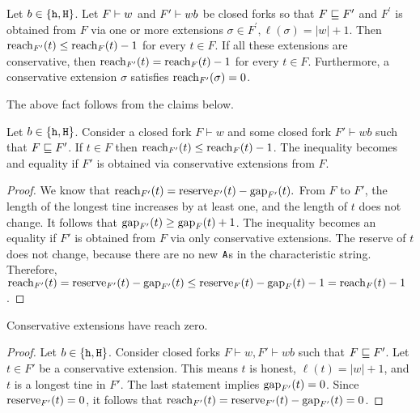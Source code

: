 \begin{fact}\label{fact:reach-fork-ext}
  Let $b \in \{\mathtt{h}, \mathtt{H}\}$. 
  Let $F \vdash w$ and $F^\prime \vdash wb$ be closed forks so that 
  $F \sqsubseteq F^\prime$ and 
  $F^\prime$ is obtained from $F$ via one or more extensions 
  $\sigma \in F^\prime, \ell(\sigma) = |w| + 1$.
  Then $\operatorname{reach}_{F^\prime}(t) \leq \operatorname{reach}_F(t) - 1$ for every $t \in F$. 
  If all these extensions are conservative, then 
  $\operatorname{reach}_{F^\prime}(t) = \operatorname{reach}_F(t) - 1$ for every $t \in F$. 
  Furthermore, a conservative extension $\sigma$ satisfies 
  $\operatorname{reach}_{F^\prime}(\sigma) = 0$.
\end{fact}
The above fact follows from the claims below.
\begin{claim}\label{claim:nex}
  Let $b \in \{\mathtt{h}, \mathtt{H}\}$. 
  Consider a closed fork $F\vdash w$ and some closed fork $F'\vdash wb$ such that $F\sqsubseteq F'$. 
  If $t \in F$ then 
  $\operatorname{reach}_{F'}(t)\leq \operatorname{reach}_{F}(t) - 1$. 
  The inequality becomes and equality 
  if $F'$ is obtained via 
  conservative extensions from $F$.
\end{claim}
\begin{proof}
  We know that $\operatorname{reach}_{F'}(t)=\operatorname{reserve}_{F'}(t)-\operatorname{gap}_{F'}(t).$ From $F$ to $F'$, the length of the longest tine increases by at least one, and the length of $t$ does not change. 
  It follows that $\operatorname{gap}_{F'}(t) \geq \operatorname{gap}_{F}(t) + 1$. 
  The inequality becomes an equality 
  if $F'$ is obtained from $F$ via only conservative extensions. 
  The reserve of $t$ does not change, because there are no new $\mathtt{A}$s in the characteristic string. Therefore, 
  $
    \operatorname{reach}_{F'}(t)
    =\operatorname{reserve}_{F'}(t)-\operatorname{gap}_{F'}(t)
    \leq \operatorname{reserve}_{F}(t)-\operatorname{gap}_{F}(t) - 1
    =\operatorname{reach}_{F}(t) - 1
  $. 
\end{proof}
\begin{claim}\label{claim:ex}
  Conservative extensions have reach zero.
\end{claim}
\begin{proof}
  Let $b \in \{\mathtt{h}, \mathtt{H}\}$. 
  Consider closed forks $F\vdash w, F'\vdash wb$ 
  such that $F\sqsubseteq F'$. 
  Let $t \in F'$ be a conservative extension. 
  This means $t$ is honest, $\ell(t) = |w| + 1$, 
  and 
  $t$ is a longest tine in $F'$. 
  The last statement implies $\operatorname{gap}_{F'}(t)=0$. 
  Since $\operatorname{reserve}_{F'}(t)=0$, it follows that 
  $\operatorname{reach}_{F'}(t)=\operatorname{reserve}_{F'}(t)-\operatorname{gap}_{F'}(t) = 0$. 
\end{proof}


